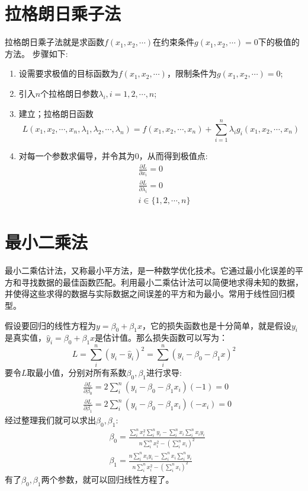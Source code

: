 \documentclass[11pt]{report}
\begin{document}
\section{拉格朗日乘子法}
拉格朗日乘子法就是求函数$f(x_1,x_2,\cdots)$在约束条件$g(x_1,x_2,\cdots)=0$下的极值的方法。
步骤如下:
\begin{enumerate}
	\item 设需要求极值的目标函数为$f(x_1,x_2,\cdots)$，限制条件为$g(x_1,x_2,\cdots)=0$;
	\item 引入$n$个拉格朗日参数$\lambda_i,i=1,2,\cdots,n$;
	\item 建立；拉格朗日函数
		\begin{equation}
			L(x_1,x_2,\cdots,x_n,\lambda_1,\lambda_2,\cdots,\lambda_n)=f(x_1,x_2,\cdots,x_n)+\sum_{i=1}^n\lambda_ig_i(x_1,x_2,\cdots,x_n)
		\end{equation}
	\item 对每一个参数求偏导，并令其为0，从而得到极值点:
		\begin{equation}
			\begin{split}
				& \frac{\partial L}{\partial x_i}=0\\
				& \frac{\partial L}{\partial \lambda_i}=0\\
				& i\in \{1,2,\cdots,n\}
			\end{split}
		\end{equation}
\end{enumerate}
\section{最小二乘法}
最小二乘估计法，又称最小平方法，是一种数学优化技术。它通过最小化误差的平方和寻找数据的最佳函数匹配。利用最小二乘估计法可以简便地求得未知的数据，并使得这些求得的数据与实际数据之间误差的平方和为最小。常用于线性回归模型。
\par
假设要回归的线性方程为$y=\beta_0+\beta_1x$，它的损失函数也是十分简单，就是假设$y_i$是真实值，$\hat{y}_i=\beta_0+\beta_1x$是估计值。那么损失函数可以写为：
\begin{equation}
	L=\sum_i^n(y_i-\hat{y}_i)^2=\sum_i^n(y_i-\beta_0-\beta_1x)^2
\end{equation}
要令$L$取最小值，分别对所有系数$\beta_0,\beta_1$进行求导:
\begin{equation}
	\begin{split}
		& \frac{\partial L}{\partial \beta_0}=2\sum_i^n(y_i-\beta_0-\beta_1x_i)(-1)=0\\
		& \frac{\partial L}{\partial \beta_1}=2\sum_i^n(y_i-\beta_0-\beta_1x_i)(-x_i)=0
	\end{split}
\end{equation}
经过整理我们就可以求出$\beta_0,\beta_1$:
\begin{equation}
	\begin{split}
		& \beta_0=\frac{\sum_i^nx_i^2\sum_i^ny_i-\sum_i^nx_i\sum_i^nx_iy_i}{n\sum_i^nx_i^2-(\sum_i^nx_i)^2}\\
		& \beta_1=\frac{n\sum_i^nx_iy_i-\sum_i^nx_i\sum_i^ny_i}{n\sum_i^nx_i^2-(\sum_i^nx_i)^2}
	\end{split}
\end{equation}
有了$\beta_0,\beta_1$两个参数，就可以回归线性方程了。
\end{document}
